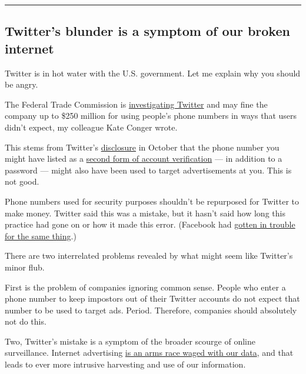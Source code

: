 \begin{center}\rule{0.5\linewidth}{\linethickness}\end{center}

\hypertarget{twitters-blunder-is-a-symptom-of-our-broken-internet}{%
\subsection{Twitter's blunder is a symptom of our broken
internet}\label{twitters-blunder-is-a-symptom-of-our-broken-internet}}

Twitter is in hot water with the U.S. government. Let me explain why you
should be angry.

The Federal Trade Commission is
\href{https://www.nytimes3xbfgragh.onion/2020/08/03/technology/ftc-twitter-privacy-violations.html}{investigating
Twitter} and may fine the company up to \$250 million for using people's
phone numbers in ways that users didn't expect, my colleague Kate Conger
wrote.

This stems from Twitter's
\href{https://help.twitter.com/en/information-and-ads}{disclosure} in
October that the phone number you might have listed as a
\href{https://www.nytimes3xbfgragh.onion/2017/08/08/technology/personaltech/protecting-your-accounts-by-text-or-app.html}{second
form of account verification} --- in addition to a password --- might
also have been used to target advertisements at you. This is not good.

Phone numbers used for security purposes shouldn't be repurposed for
Twitter to make money. Twitter said this was a mistake, but it hasn't
said how long this practice had gone on or how it made this error.
(Facebook had
\href{https://www.washingtonpost.com/technology/2019/07/23/facebook-deceived-users-about-way-it-used-phone-numbers-facial-recognition-ftc-allege-complaint/}{gotten
in trouble for the same thing}.)

There are two interrelated problems revealed by what might seem like
Twitter's minor flub.

First is the problem of companies ignoring common sense. People who
enter a phone number to keep impostors out of their Twitter accounts do
not expect that number to be used to target ads. Period. Therefore,
companies should absolutely not do this.

Two, Twitter's mistake is a symptom of the broader scourge of online
surveillance. Internet advertising
\href{https://www.nytimes3xbfgragh.onion/2020/07/15/technology/just-collect-less-data-period.html}{is
an arms race waged with our data}, and that leads to ever more intrusive
harvesting and use of our information.

